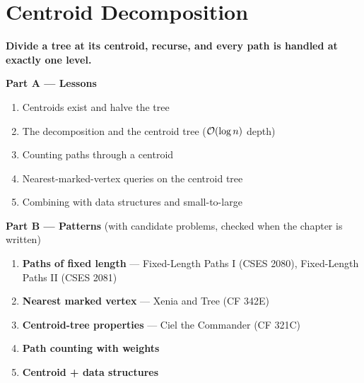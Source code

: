 \chapter{Centroid Decomposition}
\label{ch:centroid}

\begin{tcolorbox}[enhanced, colback=white, colframe=secondaryblue, boxrule=1pt, arc=2mm]
\textbf{\large\textcolor{primaryblue}{Divide a tree at its centroid, recurse, and every path is handled at exactly one level.}}
\end{tcolorbox}


\begin{plannedbox}
\textbf{Part A --- Lessons}
\begin{enumerate}[leftmargin=*, label=\textbf{A\arabic*.}, itemsep=1pt]
    \item Centroids exist and halve the tree
    \item The decomposition and the centroid tree ($\mathcal{O}(\log n)$ depth)
    \item Counting paths through a centroid
    \item Nearest-marked-vertex queries on the centroid tree
    \item Combining with data structures and small-to-large
\end{enumerate}
\textbf{Part B --- Patterns} (with candidate problems, checked when the chapter is written)
\begin{enumerate}[leftmargin=*, label=\textbf{P\arabic*.}, itemsep=1pt]
    \item \textbf{Paths of fixed length} --- Fixed-Length Paths I {\small\color{darkgray}(CSES 2080)}, Fixed-Length Paths II {\small\color{darkgray}(CSES 2081)}
    \item \textbf{Nearest marked vertex} --- Xenia and Tree {\small\color{darkgray}(CF 342E)}
    \item \textbf{Centroid-tree properties} --- Ciel the Commander {\small\color{darkgray}(CF 321C)}
    \item \textbf{Path counting with weights}
    \item \textbf{Centroid + data structures}
\end{enumerate}
\end{plannedbox}
